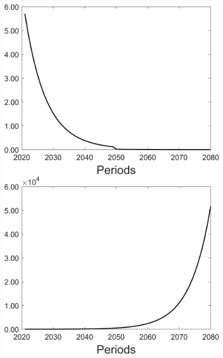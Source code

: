 \begin{figure}[h!!]
\begin{minipage}[]{0.32\textwidth}
	\end{minipage}
	\begin{minipage}[]{0.32\textwidth}
		\includegraphics[width=1\textwidth]{../../codding_model/Own/figures/Rep_agent/staticonlyRam_separate_xc_periods59_eppsilon4.00_zeta1.40_Ad08_Ac04_thetac0.70_thetad0.56_HetGrowth1_tauul0.181_util0_withtarget1_lgd0.png}
	\end{minipage}
	\begin{minipage}[]{0.32\textwidth}
		\includegraphics[width=1\textwidth]{../../codding_model/Own/figures/Rep_agent/staticonlyRam_separate_ydyc_periods59_eppsilon4.00_zeta1.40_Ad08_Ac04_thetac0.70_thetad0.56_HetGrowth1_tauul0.181_util0_withtarget1_lgd0.png}
	\end{minipage}
\end{figure}